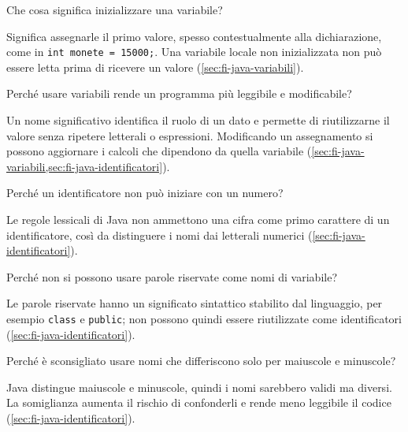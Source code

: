 \begin{exercise}
\label{ex:fi-esercizi-introduzione-java-inizializzazione}
Che cosa significa inizializzare una variabile?
\end{exercise}

Significa assegnarle il primo valore, spesso contestualmente alla dichiarazione,
come in \texttt{int monete = 15000;}. Una variabile locale non inizializzata non
può essere letta prima di ricevere un valore (\cref{sec:fi-java-variabili}).

\begin{exercise}
\label{ex:fi-esercizi-introduzione-java-variabili-vantaggi}
Perché usare variabili rende un programma più leggibile e modificabile?
\end{exercise}

Un nome significativo identifica il ruolo di un dato e permette di riutilizzarne
il valore senza ripetere letterali o espressioni. Modificando un assegnamento si
possono aggiornare i calcoli che dipendono da quella variabile
(\cref{sec:fi-java-variabili,sec:fi-java-identificatori}).

\begin{exercise}
\label{ex:fi-esercizi-introduzione-java-identificatore-numero}
Perché un identificatore non può iniziare con un numero?
\end{exercise}

Le regole lessicali di Java non ammettono una cifra come primo carattere di un
identificatore, così da distinguere i nomi dai letterali numerici
(\cref{sec:fi-java-identificatori}).

\begin{exercise}
\label{ex:fi-esercizi-introduzione-java-parole-riservate}
Perché non si possono usare parole riservate come nomi di variabile?
\end{exercise}

Le parole riservate hanno un significato sintattico stabilito dal linguaggio, per
esempio \texttt{class} e \texttt{public}; non possono quindi essere riutilizzate
come identificatori (\cref{sec:fi-java-identificatori}).

\begin{exercise}
\label{ex:fi-esercizi-introduzione-java-nomi-simili}
Perché è sconsigliato usare nomi che differiscono solo per maiuscole e minuscole?
\end{exercise}

Java distingue maiuscole e minuscole, quindi i nomi sarebbero validi ma diversi.
La somiglianza aumenta il rischio di confonderli e rende meno leggibile il codice
(\cref{sec:fi-java-identificatori}).

